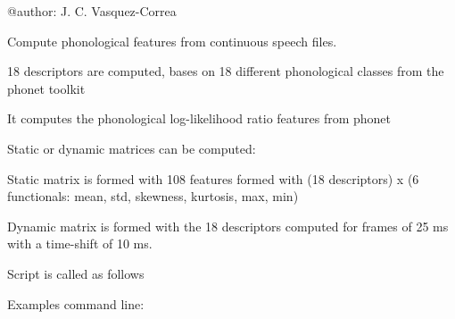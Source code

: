\documentclass[letterpaper,10pt,english]{sphinxmanual}
\begin{document}
@author: J. C. Vasquez-Correa

\begin{fulllineitems}
\label{\detokenize{Phonological:phonological.Phonological}}
Compute phonological features from continuous speech files.

18 descriptors are computed, bases on 18 different phonological classes from the phonet toolkit 

It computes the phonological log-likelihood ratio features from phonet

Static or dynamic matrices can be computed:

Static matrix is formed with 108 features formed with (18 descriptors) x (6 functionals: mean, std, skewness, kurtosis, max, min)

Dynamic matrix is formed with the 18 descriptors computed for frames of 25 ms with a time-shift of 10 ms.

Script is called as follows

\begin{sphinxVerbatim}[commandchars=\\\{\}]
                 
\end{sphinxVerbatim}

Examples command line:


\end{fulllineitems}
\end{document}
